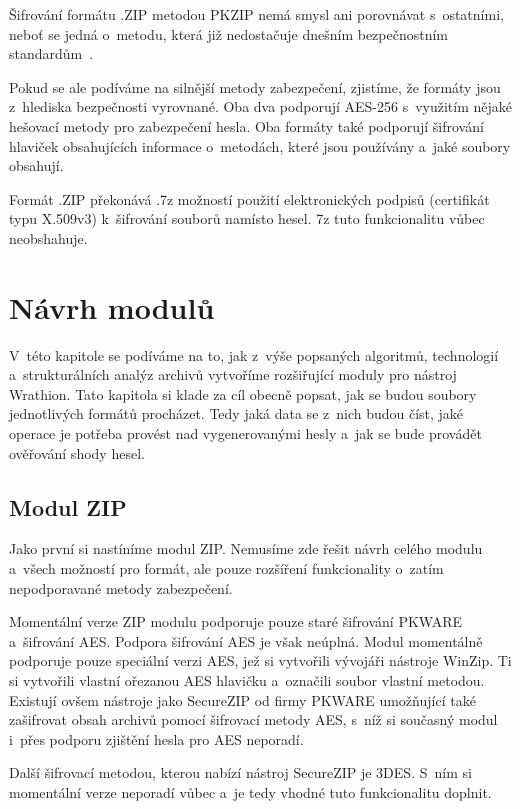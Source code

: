  Šifrování formátu .ZIP metodou PKZIP nemá smysl ani porovnávat s~ostatními, neboť se jedná
o~metodu, která již nedostačuje dnešním bezpečnostním standardům~\cite{PKWARE:2014}. 

 Pokud se ale podíváme na silnější metody zabezpečení, zjistíme, že formáty jsou z~hlediska
bezpečnosti vyrovnané. Oba dva podporují AES-256 s~využitím nějaké hešovací metody pro zabezpečení
hesla. Oba formáty také podporují šifrování hlaviček obsahujících informace o~metodách, které jsou
používány a~jaké soubory obsahují.

 Formát .ZIP překonává .7z možností použití elektronických podpisů (certifikát typu X.509v3)
k~šifrování souborů namísto hesel. 7z tuto funkcionalitu vůbec neobshahuje. 



\chapter{Návrh modulů}
\label{ch:moduly}
V~této kapitole se podíváme na to, jak z~výše popsaných algoritmů, technologií a~strukturálních
analýz archivů vytvoříme rozšiřující moduly pro nástroj Wrathion. Tato kapitola si klade za cíl
obecně popsat, jak se budou soubory jednotlivých formátů procházet. Tedy jaká data se z~nich budou
číst, jaké operace je potřeba provést nad vygenerovanými hesly a~jak se bude provádět ověřování
shody hesel.

\section{Modul ZIP}
Jako první si nastíníme modul ZIP. Nemusíme zde řešit návrh celého modulu a~všech
možností pro formát, ale pouze rozšíření funkcionality o~zatím nepodporavané metody zabezpečení.

 Momentální verze ZIP modulu podporuje pouze staré šifrování PKWARE a~šifrování AES. Podpora
šifrování AES je však neúplná. Modul momentálně podporuje pouze speciální verzi AES, jež si
vytvořili vývojáři nástroje WinZip. Ti si vytvořili vlastní ořezanou AES hlavičku a~označili
soubor vlastní metodou. Existují ovšem nástroje jako SecureZIP od firmy PKWARE umožňující také
zašifrovat obsah archivů pomocí šifrovací metody AES, s~níž si současný modul i~přes podporu
zjištění hesla pro AES neporadí.

 Další šifrovací metodou, kterou nabízí nástroj SecureZIP je 3DES. S~ním si momentální verze
neporadí vůbec a~je tedy vhodné tuto funkcionalitu doplnit.

